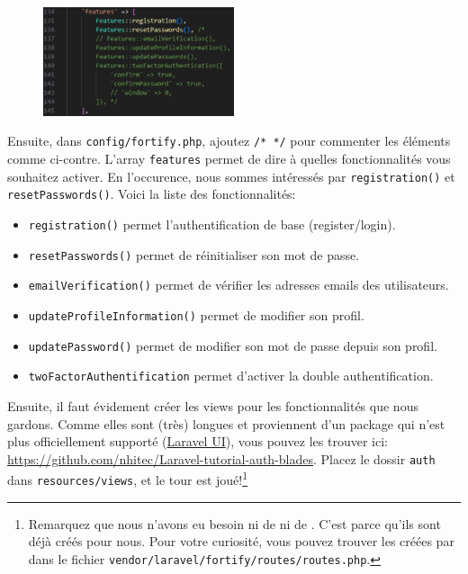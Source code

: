 \begin{figure}
    \vspace{-0.5cm}
    \includegraphics[width=0.5\textwidth]{figures-C1/config_fortify.pdf}
\end{figure}

Ensuite, dans \verb|config/fortify.php|, ajoutez \verb|/* */| pour commenter les éléments comme ci-contre. L'array \verb|features| permet de dire à \fortify{} quelles fonctionnalités vous souhaitez activer. En l'occurence, nous sommes intéressés par \verb|registration()| et \verb|resetPasswords()|. Voici la liste des fonctionnalités:

\begin{itemize}
    \item \verb|registration()| permet l'authentification de base (register/login).
    \item \verb|resetPasswords()| permet de réinitialiser son mot de passe.
\end{itemize}

\begin{itemize}[resume, before = \vspace*{-0.63cm}]
    \item \verb|emailVerification()| permet de vérifier les adresses emails des utilisateurs.
    \item \verb|updateProfileInformation()| permet de modifier son profil.
    \item \verb|updatePassword()| permet de modifier son mot de passe depuis son profil. 
    \item \verb|twoFactorAuthentification| permet d'activer la double authentification.
\end{itemize}

\newpage

Ensuite, il faut évidement créer les views pour les fonctionnalités que nous gardons. Comme elles sont (très) longues et proviennent d'un package qui n'est plus officiellement supporté (\href{https://github.com/laravel/ui}{Laravel UI}), vous pouvez les trouver ici: \url{https://github.com/nhitec/Laravel-tutorial-auth-blades}. Placez le dossir \verb|auth| dans \verb|resources/views|, et le tour est joué!\footnote{Remarquez que nous n'avons eu besoin ni de \controllers{} ni de \routes{}. C'est parce qu'ils sont déjà créés pour nous. Pour votre curiosité, vous pouvez trouver les \routes{} créées par \fortify{} dans le fichier \verb|vendor/laravel/fortify/routes/routes.php|.}

